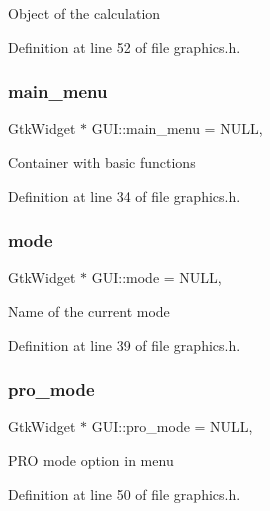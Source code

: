 Object of the calculation 

Definition at line 52 of file graphics.\+h.

\mbox{\label{class_g_u_i_a752852ce4ab08ffb3e14d510db6d9451}} 
\subsubsection{\texorpdfstring{main\_menu}{main\_menu}}
{\footnotesize\ttfamily Gtk\+Widget $\ast$ G\+U\+I\+::main\+\_\+menu = N\+U\+LL\hspace{0.3cm}{\ttfamily [static]}, {\ttfamily [protected]}}

Container with basic functions 

Definition at line 34 of file graphics.\+h.

\mbox{\label{class_g_u_i_a5f0b2e50665aec708c645d505ee32101}} 
\subsubsection{\texorpdfstring{mode}{mode}}
{\footnotesize\ttfamily Gtk\+Widget $\ast$ G\+U\+I\+::mode = N\+U\+LL\hspace{0.3cm}{\ttfamily [static]}, {\ttfamily [protected]}}

Name of the current mode 

Definition at line 39 of file graphics.\+h.

\mbox{\label{class_g_u_i_ab7f93bcfb9342c9ea4a53197253e8b10}} 
\subsubsection{\texorpdfstring{pro\_mode}{pro\_mode}}
{\footnotesize\ttfamily Gtk\+Widget $\ast$ G\+U\+I\+::pro\+\_\+mode = N\+U\+LL\hspace{0.3cm}{\ttfamily [static]}, {\ttfamily [protected]}}

P\+RO mode option in menu 

Definition at line 50 of file graphics.\+h.

\mbox{\label{class_g_u_i_abd7af241445c2d978c1c5a2621761cda}} 
